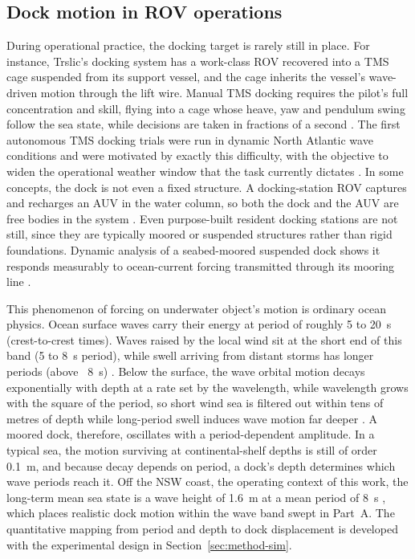 \subsection{Dock motion in ROV operations}
\label{sec:lit-dock-motion}

During operational practice, the docking target is rarely still in place. For instance, Trslic's docking system has a work-class ROV recovered into a TMS cage suspended from its support vessel, and the cage inherits the vessel's wave-driven motion through the lift wire. Manual TMS docking requires the pilot's full concentration and skill, flying into a cage whose heave, yaw and pendulum swing follow the sea state, while decisions are taken in fractions of a second \cite{trslic2020vision}. The first autonomous TMS docking trials were run in dynamic North Atlantic wave conditions and were motivated by exactly this difficulty, with the objective to widen the operational weather window that the task currently dictates \cite{trslic2020vision}. In some concepts, the dock is not even a fixed structure. A docking-station ROV captures and recharges an AUV in the water column, so both the dock and the AUV are free bodies in the system \cite{morinaga2021development}. Even purpose-built resident docking stations are not still, since they are typically moored or suspended structures rather than rigid foundations. Dynamic analysis of a seabed-moored suspended dock shows it responds measurably to ocean-current forcing transmitted through its mooring line \cite{guo2024dynamic}.

This phenomenon of forcing on underwater object's motion is ordinary ocean physics. Ocean surface waves carry their energy at period of roughly 5 to 20~s (crest-to-crest times). Waves raised by the local wind sit at the short end of this band (5 to 8~s period), while swell arriving from distant storms has longer periods (above ~8~s) \cite{holthuijsen2007waves}. Below the surface, the wave orbital motion decays exponentially with depth at a rate set by the wavelength, while wavelength grows with the square of the period, so short wind sea is filtered out within tens of metres of depth while long-period swell induces wave motion far deeper \cite{holthuijsen2007waves}. A moored dock, therefore, oscillates with a period-dependent amplitude. In a typical sea, the motion surviving at continental-shelf depths is still of order 0.1~m, and because decay depends on period, a dock's depth determines which wave periods reach it. Off the NSW coast, the operating context of this work, the long-term mean sea state is a wave height of 1.6~m at a mean period of 8~s \cite{short1992wave,kinsela2024nearshore}, which places realistic dock motion within the wave band swept in Part~A. The quantitative mapping from period and depth to dock displacement is developed with the experimental design in Section~\ref{sec:method-sim}.

